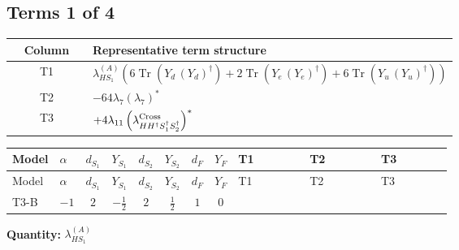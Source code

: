 \documentclass[8pt]{article}
\begin{document}
\begin{landscape}
\subsection*{Terms 1 of 4}
\begin{center}
\begin{tabular}{@{}c >{\raggedright\arraybackslash}p{0.82\linewidth}@{}}
\toprule
Column & Representative term structure \\
\midrule
T1 & \(\displaystyle {\lambda_{HS_1}^{(A)}} (6 \operatorname{Tr}\!\left({Y_d}\,\left({Y_d}\right)^{\dagger}\right)+2 \operatorname{Tr}\!\left({Y_e}\,\left({Y_e}\right)^{\dagger}\right)+6 \operatorname{Tr}\!\left({Y_u}\,\left({Y_u}\right)^{\dagger}\right))\) \\
\midrule
T2 & \(\displaystyle -64 {\lambda_{7}} \left({\lambda_{7}}\right)^{*}\) \\
\midrule
T3 & \(\displaystyle +4 {\lambda_{11}} \left({\lambda_{H H^\dagger S_1^\dagger S_2^\dagger}^{\rm Cross}}\right)^{*}\) \\
\midrule
\bottomrule
\end{tabular}
\end{center}
\smallskip
\tiny
\begin{longtable}{@{}llcccccc >{\raggedright\arraybackslash}p{0.21\linewidth} >{\raggedright\arraybackslash}p{0.21\linewidth} >{\raggedright\arraybackslash}p{0.21\linewidth}@{}}
\toprule
Model & $\alpha$ & $d_{S_1}$ & $Y_{S_1}$ & $d_{S_2}$ & $Y_{S_2}$ & $d_F$ & $Y_F$ & T1 & T2 & T3 \\
\midrule
\endfirsthead
\toprule
Model & $\alpha$ & $d_{S_1}$ & $Y_{S_1}$ & $d_{S_2}$ & $Y_{S_2}$ & $d_F$ & $Y_F$ & T1 & T2 & T3 \\
\midrule
\endhead
T3-B & $-1$ & $2$ & $-\frac{1}{2}$ & $2$ & $\frac{1}{2}$ & $1$ & $0$ & \scriptsize\adjustbox{max width=\linewidth}{$\begin{gathered} {\lambda_{HS_1}^{(A)}} (6 \operatorname{Tr}\!\left({Y_d}\,\left({Y_d}\right)^{\dagger}\right)+2 \operatorname{Tr}\!\left({Y_e}\,\left({Y_e}\right)^{\dagger}\right)+6 \operatorname{Tr}\!\left({Y_u}\,\left({Y_u}\right)^{\dagger}\right))\end{gathered}$} & \scriptsize\adjustbox{max width=\linewidth}{$\begin{gathered} -64 {\lambda_{7}} \left({\lambda_{7}}\right)^{*}\end{gathered}$} & \scriptsize\adjustbox{max width=\linewidth}{$\begin{gathered} +4 {\lambda_{11}} \left({\lambda_{H H^\dagger S_1^\dagger S_2^\dagger}^{\rm Cross}}\right)^{*}\end{gathered}$} \\
\midrule
\bottomrule
\end{longtable}
\clearpage
\noindent\textbf{Quantity: }$\lambda_{HS_1}^{(A)}$\par\smallskip

\end{landscape}
\end{document}
